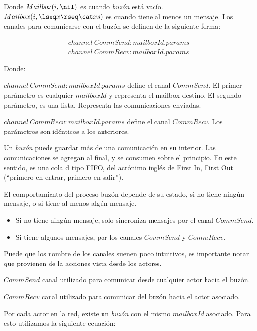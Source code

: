 Donde $Mailbox(i, \nil)$ es cuando \textit{buzón} está vacío. $Mailbox(i, \lseq x \rseq \cat xs )$ es cuando tiene al menos un mensaje. Los canales para comunicarse con el buzón se definen de la siguiente forma:

\begin{align*}
channel\ CommSend:mailboxId.params \\
channel\ CommRecv:mailboxId.params
\end{align*}

Donde:
\begin{description}
 \item $channel\ CommSend:mailboxId.params$ define el canal $CommSend$. El primer parámetro es cualquier $mailboxId$ y representa el mailbox destino. El segundo parámetro, es una lista. Representa las comunicaciones enviadas. 
 \item $channel\ CommRecv:mailboxId.params$ define el canal $CommRecv$. Los parámetros son idénticos a los anteriores.
\end{description}

Un \textit{buzón} puede guardar más de una comunicación en su interior. Las comunicaciones se agregan al final, y se consumen sobre el principio. En este sentido, es una cola d tipo FIFO, del acrónimo inglés de First In, First Out (``primero en entrar, primero en salir'').

El comportamiento del proceso buzón depende de su estado, si no tiene ningún mensaje, o si tiene al menos algún mensaje. 

\begin{itemize}
\item Si no tiene ningún mensaje, solo sincroniza mensajes por el canal $CommSend$.
\item Si tiene algunos mensajes, por los canales $CommSend$ y $CommRecv$.
\end{itemize}

Puede que los nombre de los canales suenen poco intuitivos, es importante notar que provienen de la acciones vista desde los actores.

\begin{description}
\item $CommSend$ canal utilizado para comunicar desde cualquier actor hacia el buzón.
\item $CommRecv$ canal utilizado para comunicar del buzón hacia el actor asociado.
\end{description}

Por cada actor en la red, existe un \textit{buzón} con el mismo $mailboxId$ asociado. Para esto utilizamos la siguiente ecuación:

